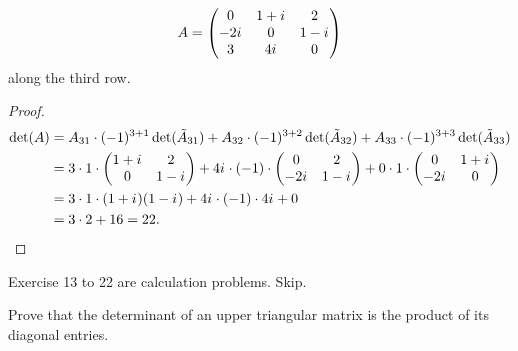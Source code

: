 \setcounter{exercise}{8}
\begin{exercise} \label{exercise 4.2.9}
\[
    A = \begin{pmatrix}
        0     & 1 + {i\mkern1mu} & 2 \\
        -2{i\mkern1mu} & 0       & 1 - {i\mkern1mu} \\
        3     & 4{i\mkern1mu}    & 0
    \end{pmatrix}
\]
along the third row.
\end{exercise}

\begin{proof}
\begin{align*}
    \det(A) & = A_{31} \cdot (-1)^{3 + 1} \det(\tilde{A}_{31})
              + A_{32} \cdot (-1)^{3 + 2} \det(\tilde{A}_{32})
              + A_{33} \cdot (-1)^{3 + 3} \det(\tilde{A}_{33}) \\
            & = 3 \cdot 1 \cdot \begin{pmatrix} 1 + {i\mkern1mu} & 2 \\ 0 & 1 - {i\mkern1mu} \end{pmatrix}
              + 4 {i\mkern1mu} \cdot (-1) \cdot \begin{pmatrix} 0 & 2 \\ -2{i\mkern1mu} & 1 - {i\mkern1mu} \end{pmatrix}
              + 0 \cdot 1 \cdot \begin{pmatrix} 0 & 1 + {i\mkern1mu} \\ -2{i\mkern1mu} & 0 \end{pmatrix} \\
            & = 3 \cdot 1 \cdot (1 + {i\mkern1mu})(1 - {i\mkern1mu})
              + 4 {i\mkern1mu} \cdot (-1) \cdot 4 {i\mkern1mu}
              + 0 \\
            & = 3 \cdot 2 + 16 = 22.
\end{align*}
\end{proof}

Exercise 13 to 22 are calculation problems. Skip.

\setcounter{exercise}{22}
\begin{exercise} \label{exercise 4.2.23}
Prove that the determinant of an upper triangular matrix is the product of its diagonal entries.
\end{exercise}

